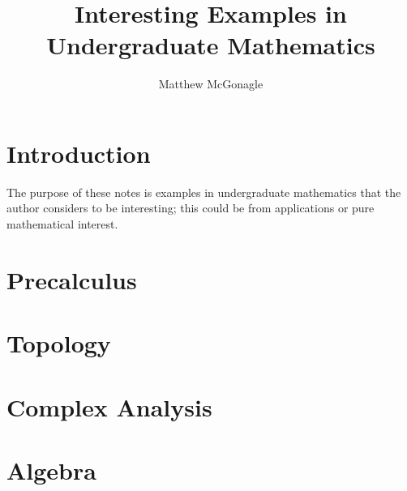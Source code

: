 \documentclass{article}
\title{Interesting Examples in Undergraduate Mathematics}
\author{Matthew McGonagle}
\begin{document}
\maketitle

\tableofcontents

\section{Introduction}

The purpose of these notes is examples in undergraduate mathematics that the author considers to be interesting; this could be from applications or pure mathematical interest. 

\section{Precalculus}














\section{Topology}


\section{Complex Analysis}

\section{Algebra}


{}

\end{document}
